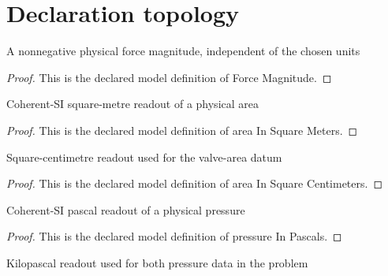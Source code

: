 \section{Declaration topology}
\begin{definition}
  \label{def:physics:phyx-mini-0661:phyxminiproblems-problemphyxmini0661-forcemagnitude}
  A nonnegative physical force magnitude, independent of the chosen units
\end{definition}
\begin{proof}
  This is the declared model definition of Force Magnitude.
\end{proof}
\begin{definition}
  \label{def:physics:phyx-mini-0661:phyxminiproblems-problemphyxmini0661-areainsquaremeters}
  Coherent-SI square-metre readout of a physical area
\end{definition}
\begin{proof}
  This is the declared model definition of area In Square Meters.
\end{proof}
\begin{definition}
  \label{def:physics:phyx-mini-0661:phyxminiproblems-problemphyxmini0661-areainsquarecentimeters}
  Square-centimetre readout used for the valve-area datum
\end{definition}
\begin{proof}
  This is the declared model definition of area In Square Centimeters.
\end{proof}
\begin{definition}
  \label{def:physics:phyx-mini-0661:phyxminiproblems-problemphyxmini0661-pressureinpascals}
  Coherent-SI pascal readout of a physical pressure
\end{definition}
\begin{proof}
  This is the declared model definition of pressure In Pascals.
\end{proof}
\begin{definition}
  \label{def:physics:phyx-mini-0661:phyxminiproblems-problemphyxmini0661-pressureinkilopascals}
  Kilopascal readout used for both pressure data in the problem
\end{definition}
